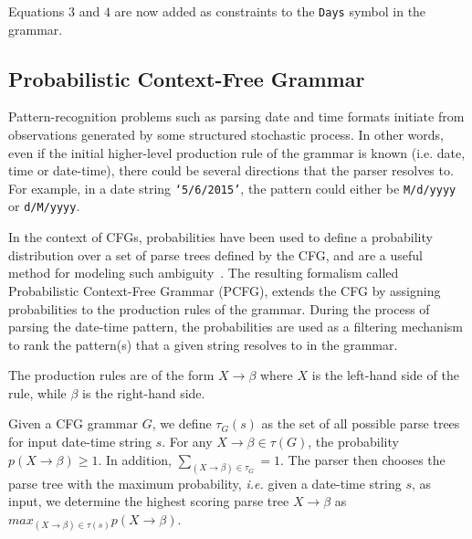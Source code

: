 Equations $3$ and $4$ are now added as constraints to the \texttt{Days} symbol in the grammar.

\subsection{Probabilistic Context-Free Grammar}

Pattern-recognition problems such as parsing date and time formats initiate from observations generated by some structured stochastic process. In other words, even if the initial higher-level production rule of the grammar is known (i.e. date, time or date-time), there could be several directions that the parser resolves to. For example, in a date string \texttt{`5/6/2015'}, the pattern could either be \texttt{M/d/yyyy} or \texttt{d/M/yyyy}. 

In the context of CFGs, probabilities have been used to define a probability distribution over a set of parse trees defined by the CFG, and are a useful method for modeling such ambiguity~\cite{Collins:2003,Manning:1999}. The resulting formalism called Probabilistic Context-Free Grammar (PCFG), extends the CFG by assigning probabilities to the production rules of the grammar. During the process of parsing the date-time pattern, the probabilities are used as a filtering mechanism to rank the pattern(s) that a given string resolves to in the grammar. 

The production rules are of the form $ X \rightarrow \beta$ where $X$ is the left-hand side of the rule, while $\beta$ is the right-hand side.

Given a CFG grammar $G$, we define  $\tau_G(s)$ as the set of all possible parse trees for input date-time string $s$.  For any $X \rightarrow \beta \in \tau(G)$, the probability $p(X \rightarrow \beta) \ge 1$. In addition, $\sum_{(X \rightarrow \beta) \in \tau_{G}} = 1$. The parser then chooses the parse tree with the maximum probability, \textit{i.e.} given a date-time string $s$, as input, we determine the highest scoring parse tree $X \rightarrow \beta$ as  $max_{(X \rightarrow \beta) \in \tau(s)} p(X \rightarrow \beta)$.

